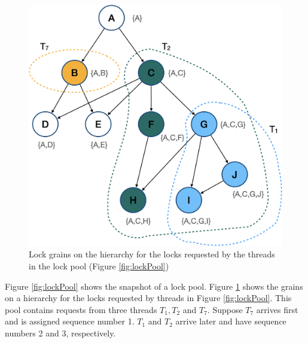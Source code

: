 \begin{figure}
	\centering
	\captionsetup{justification=centering}
	\includegraphics[width=.7\columnwidth]{figures/CALock_Lock_grains_inPool.png}
	\caption{Lock grains on the hierarchy for the locks requested by the threads in the lock pool (Figure \ref{fig:lockPool})}
	\label{fig:lockGrainsOnHierarchy}
\end{figure}

Figure \ref{fig:lockPool} shows the snapshot of a lock pool. Figure \ref{fig:lockGrainsOnHierarchy} shows the grains on a hierarchy for the locks requested by threads in Figure \ref{fig:lockPool}. This pool contains requests from three threads $T_1, T_2$ and $T_7$. Suppose $T_7$ arrives first and is assigned sequence number 1. $T_1$ and $T_2$ arrive later and have sequence numbers 2 and 3, respectively. 



